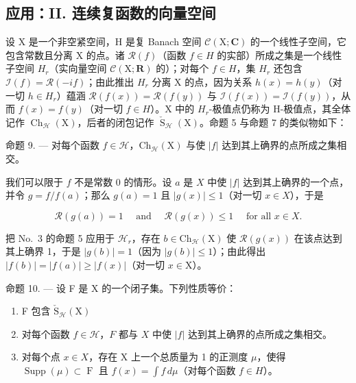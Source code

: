 \subsection{应用：II. 连续复函数的向量空间}

设 X 是一个非空紧空间，H 是复 Banach 空间 \(\mathcal{C}(\mathrm{X};\mathbf{C})\) 的一个线性子空间，它包含常数且分离 X 的点。诸 \(\mathcal{R}(f)\)（函数 \(f \in H\) 的实部）所成之集是一个线性子空间 \(H_{r}\)（实向量空间 \(\mathcal{C}(\mathrm{X};\mathbf{R})\) 的）；对每个 \(f \in H\)，集 \(H_{r}\) 还包含 \(\mathcal{I}(f) = \mathcal{R}(-if)\)；由此推出 \(H_{r}\) 分离 X 的点，因为关系 \(h(x) = h(y)\)（对一切 \(h \in H_{r}\)）蕴涵 \(\mathcal{R}(f(x)) = \mathcal{R}(f(y))\) 与 \(\mathcal{I}(f(x)) = \mathcal{I}(f(y))\)，从而 \(f(x) = f(y)\)（对一切 \(f \in H\)）。X 中的 \(H_{r}\)-极值点仍称为 H-极值点，其全体记作 \(\operatorname{Ch}_{\mathcal{H}}(\mathrm{X})\)，后者的闭包记作 \(\check{\operatorname{S}}_{\mathcal{H}}(\mathrm{X})\)。命题 5 与命题 7 的类似物如下：

命题 9. --- 对每个函数 \(f \in \mathcal{H}\)，\(\mathrm{Ch}_{\mathcal{H}}(\mathrm{X})\) 与使 \(|f|\) 达到其上确界的点所成之集相交。

我们可以限于 \(f\) 不是常数 0 的情形。设 \(a\) 是 \(X\) 中使 \(|f|\) 达到其上确界的一个点，并令 \(g = f / f(a)\)；那么 \(g(a) = 1\) 且 \(|g(x)| \leqslant 1\)（对一切 \(x \in X\)），于是

\[
\mathscr {R} (g (a)) = 1 \quad \text { and } \quad \mathscr {R} (g (x)) \leqslant 1 \quad \text { for   all } x \in X.
\]

把 No.~3 的命题 5 应用于 \(\mathcal{H}_r\)，存在 \(b \in \mathrm{Ch}_{\mathcal{H}}(\mathrm{X})\) 使 \(\mathcal{R}(g(x))\) 在该点达到其上确界 1，于是 \(|g(b)| = 1\)（因为 \(|g(b)| \leqslant 1\)）；由此得出 \(|f(b)| = |f(a)| \geqslant |f(x)|\)（对一切 \(x \in \mathrm{X}\)）。

命题 10. --- 设 F 是 X 的一个闭子集。下列性质等价：

\begin{enumerate}
\def\labelenumi{\alph{enumi})}
\item
  F 包含 \(\check{\mathrm{S}}_{\mathcal{H}}(\mathrm{X})\)
\item
  对每个函数 \(f \in \mathcal{H}\)，\(F\) 都与 \(X\) 中使 \(|f|\) 达到其上确界的点所成之集相交。
\item
  对每个点 \(x \in X\)，存在 X 上一个总质量为 1 的正测度 \(\mu\)，使得 \(\operatorname{Supp}(\mu) \subset \operatorname{F}\) 且 \(f(x) = \int f \, d\mu\)（对每个函数 \(f \in H\)）。
\end{enumerate}

